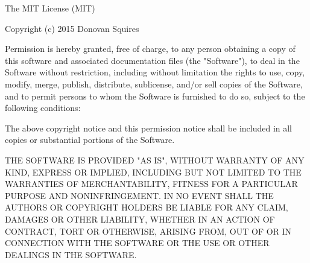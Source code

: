 The MIT License (MIT)

Copyright (c) 2015 Donovan Squires

Permission is hereby granted, free of charge, to any person obtaining a copy
of this software and associated documentation files (the "Software"), to deal
in the Software without restriction, including without limitation the rights
to use, copy, modify, merge, publish, distribute, sublicense, and/or sell
copies of the Software, and to permit persons to whom the Software is
furnished to do so, subject to the following conditions:

The above copyright notice and this permission notice shall be included in all
copies or substantial portions of the Software.

THE SOFTWARE IS PROVIDED "AS IS", WITHOUT WARRANTY OF ANY KIND, EXPRESS OR
IMPLIED, INCLUDING BUT NOT LIMITED TO THE WARRANTIES OF MERCHANTABILITY,
FITNESS FOR A PARTICULAR PURPOSE AND NONINFRINGEMENT. IN NO EVENT SHALL THE
AUTHORS OR COPYRIGHT HOLDERS BE LIABLE FOR ANY CLAIM, DAMAGES OR OTHER
LIABILITY, WHETHER IN AN ACTION OF CONTRACT, TORT OR OTHERWISE, ARISING FROM,
OUT OF OR IN CONNECTION WITH THE SOFTWARE OR THE USE OR OTHER DEALINGS IN THE
SOFTWARE.



% 


